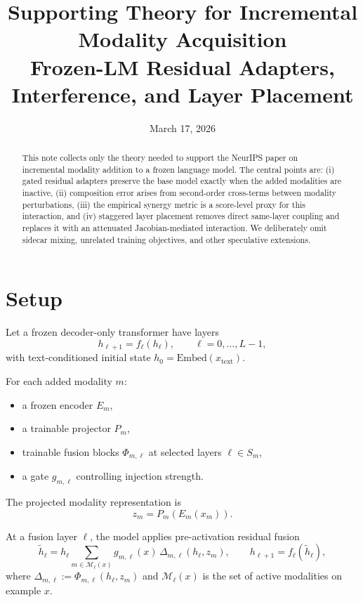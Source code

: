 \documentclass[11pt]{article}
\title{Supporting Theory for Incremental Modality Acquisition\\
\large Frozen-LM Residual Adapters, Interference, and Layer Placement}
\date{March 17, 2026}
\begin{document}
\maketitle

\begin{abstract}
This note collects only the theory needed to support the NeurIPS paper on
incremental modality addition to a frozen language model. The central points
are: (i) gated residual adapters preserve the base model exactly when the added
modalities are inactive, (ii) composition error arises from second-order
cross-terms between modality perturbations, (iii) the empirical synergy metric
is a score-level proxy for this interaction, and (iv) staggered layer placement
removes direct same-layer coupling and replaces it with an attenuated
Jacobian-mediated interaction. We deliberately omit sidecar mixing, unrelated
training objectives, and other speculative extensions.
\end{abstract}

\section{Setup}

Let a frozen decoder-only transformer have layers
\[
h_{\ell+1} = f_\ell(h_\ell), \qquad \ell = 0, \dots, L-1,
\]
with text-conditioned initial state $h_0 = \mathrm{Embed}(x_{\text{text}})$.

For each added modality $m$:
\begin{itemize}
\item a frozen encoder $E_m$,
\item a trainable projector $P_m$,
\item trainable fusion blocks $\Phi_{m,\ell}$ at selected layers $\ell \in S_m$,
\item a gate $g_{m,\ell}$ controlling injection strength.
\end{itemize}

The projected modality representation is
\[
z_m = P_m(E_m(x_m)).
\]

At a fusion layer $\ell$, the model applies pre-activation residual fusion
\begin{equation}
\tilde h_\ell
=
h_\ell
 \sum_{m \in \mathcal{M}_\ell(x)}
 g_{m,\ell}(x)\,\Delta_{m,\ell}(h_\ell, z_m),
\qquad
h_{\ell+1} = f_\ell(\tilde h_\ell),
\label{eq:fusion}
\end{equation}
where $\Delta_{m,\ell} := \Phi_{m,\ell}(h_\ell, z_m)$ and
$\mathcal{M}_\ell(x)$ is the set of active modalities on example $x$.
\end{document}
